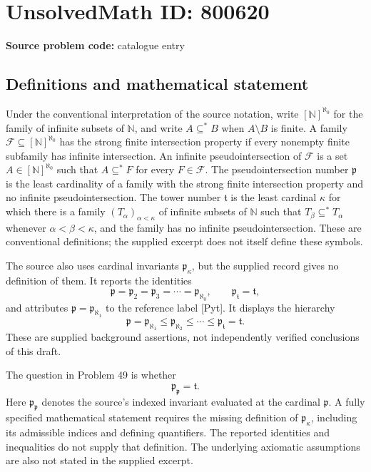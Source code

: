 \documentclass[11pt]{article}
\newcommand{\N}{\mathbb{N}}
\begin{document}
\section*{UnsolvedMath ID: 800620}
\textbf{Source problem code:} catalogue entry
\subsection{Definitions and mathematical statement}
Under the conventional interpretation of the source notation, write $[\N]^{\aleph_0}$ for the family of infinite subsets of $\N$, and write $A\subseteq^*B$ when $A\setminus B$ is finite. A family $\mathcal F\subseteq[\N]^{\aleph_0}$ has the strong finite intersection property if every nonempty finite subfamily has infinite intersection. An infinite pseudointersection of $\mathcal F$ is a set $A\in[\N]^{\aleph_0}$ such that $A\subseteq^*F$ for every $F\in\mathcal F$. The pseudointersection number $\mathfrak p$ is the least cardinality of a family with the strong finite intersection property and no infinite pseudointersection. The tower number $\mathfrak t$ is the least cardinal $\kappa$ for which there is a family $(T_\alpha)_{\alpha<\kappa}$ of infinite subsets of $\N$ such that $T_\beta\subseteq^*T_\alpha$ whenever $\alpha<\beta<\kappa$, and the family has no infinite pseudointersection. These are conventional definitions; the supplied excerpt does not itself define these symbols.

The source also uses cardinal invariants $\mathfrak p_\kappa$, but the supplied record gives no definition of them. It reports the identities
\[
\mathfrak p=\mathfrak p_2=\mathfrak p_3=\cdots=\mathfrak p_{\aleph_0},
\qquad
\mathfrak p_{\mathfrak t}=\mathfrak t,
\]
and attributes $\mathfrak p=\mathfrak p_{\aleph_1}$ to the reference label [Pyt]. It displays the hierarchy
\[
\mathfrak p=\mathfrak p_{\aleph_1}\leq\mathfrak p_{\aleph_2}\leq\cdots\leq\mathfrak p_{\mathfrak t}=\mathfrak t.
\]
These are supplied background assertions, not independently verified conclusions of this draft.

The question in Problem 49 is whether
\[
\mathfrak p_{\mathfrak p}=\mathfrak t.
\]
Here $\mathfrak p_{\mathfrak p}$ denotes the source's indexed invariant evaluated at the cardinal $\mathfrak p$. A fully specified mathematical statement requires the missing definition of $\mathfrak p_\kappa$, including its admissible indices and defining quantifiers. The reported identities and inequalities do not supply that definition. The underlying axiomatic assumptions are also not stated in the supplied excerpt.
\end{document}
